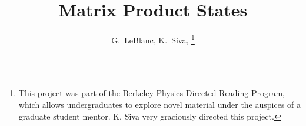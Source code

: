 \documentclass[12pt]{article}
\begin{document}
\title{Matrix Product States}
%
%
%
\author{G.~LeBlanc,
K.~Siva,
\thanks{This project was part of the Berkeley Physics Directed Reading Program, which allows undergraduates to explore novel material under the auspices of a graduate student mentor. K. Siva very graciously directed this project.}}

\maketitle
\end{document}
